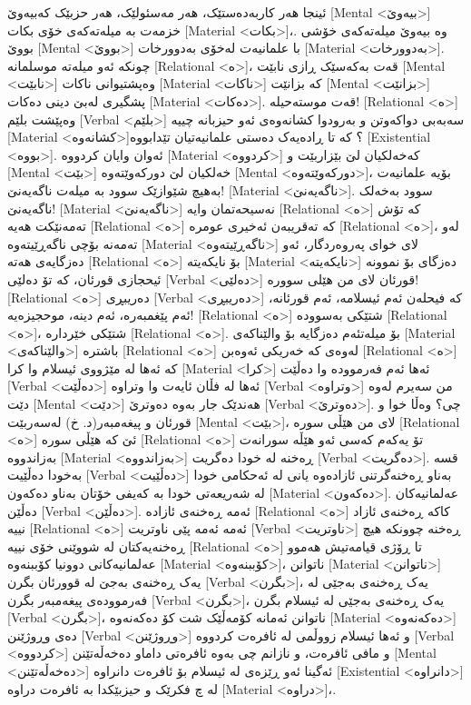 ئینجا هەر کاربەدەستێک، هەر مەسئولێک، هەر حزبێک کەبیەوێ [Mental <بیەوێ>] خزمەت بە میلەتەکەی خۆی بکات [Material <بکات>]،.
وە بیەوێ میلەتەکەی خۆشی بووێ [Mental <بووێ>] با علمانیەت لەخۆی بەدوورخات [Material <بەدوورخات>]. چونکە ئەو میلەتە موسلمانە [Relational <ە>]، قەت بەکەسێک ڕازی نابێت [Mental <نابێت>] وەپشتیوانی ناکات [Material <ناکات>] کە بزانێت [Mental <بزانێت>] پشگیری لەبێ دینی دەکات [Material <دەکات>]. قەت موستەحیلە! [Relational <ە>] وەپێشت بلێم [Verbal <بلێم>] سەبەبی دواکەوتن و بەرودوا کشانەوەی ئەو حیزبانە چییە [Material <کشانەوە>]؟ کە تا ڕادەیەک دەستی علمانیەتیان تێدابووە [Existential <بووە>]. ئەوان وایان کردووە [Material <کردووە>] کەخەلکیان لێ بێزاربێت و [Mental <بێت>] خەلکیان لێ دورکەوێتەوە [Mental <دورکەوێتەوە>]، بۆیە علمانیەت بەهیچ شێوازێک سوود بە میلەت ناگەیەنێ! [Material <ناگەیەنێ>].
سوود بەخەلک ناگەیەنێ! [Material <ناگەیەنێ>] نەسیحەتمان وایە [Relational <ە>] کە تۆش تەمەنێکت هەیە [Relational <ە>] کە تەقریبەن ئەخیری عومرە [Relational <ە>]، لەو تەمەنە بۆچی ناگەڕێیتەوە [Material <ناگەڕێیتەوە>] لای خوای پەروەردگار، ئەو دەزگایەی هەتە [Relational <ە>] بۆ نایکەیتە [Material <نایکەیتە>] دەزگای بۆ نموونە ئیحجازی قورئان، کە تۆ دەلێی [Verbal <دەلێی>] قورئان لای من هێلی سوورە! [Relational <ە>] دەریبڕی [Verbal <دەریبڕی>] کە فیحلەن ئەم ئیسلامە، ئەم قورئانە، ئەم پێغمبەرە، ئەم دینە، موحجیزەیە! [Relational <ە>] شتێکی بەسوودە [Relational <ە>]، شتێکی خێردارە [Relational <ە>]. بۆ میلەتئەم دەزگایە بۆ والێناکەی [Material <والێناکەی>] باشترە [Relational <ە>] لەوەی کە خەریکی ئەوەبن [Relational <ە>] کە ئەها لە مێژووی ئیسلام وا کرا [Material <کرا>] ئەها ئەم فەرموودە وا دەڵێت [Verbal <دەڵێت>] ئەها لە فڵان ئایەت وا وتراوە [Verbal <وتراوە>] من سەیرم لەوە دێت [Mental <دێت>] هەندێک جار بەوە دەوترێ [Verbal <دەوترێ>].
چی؟ وەڵا خوا و قورئان و پیغەمبەر(د. خ) لەسەربێت [Mental <بێت>]، لای من هێڵی سورە [Relational <ە>] ئێ کە هێڵی سوره [Relational <ە>] تۆ یەکەم کەسی ئەو هێڵە سورانەت بەزاندووە [Material <بەزاندووە>] ڕەخنە لە خودا دەگریت [Verbal <دەگریت>]. قسە بەخودا دەڵێیت [Verbal <دەڵێیت>] بەناو ڕەخنەگرتنی ئازادەوە یانی لە ئەحکامی خودا لە شەریعەتی خودا بە کەیفی خۆتان بەناو دەکەون [Material <دەکەون>]. عەلمانیەکان دەڵێن [Verbal <دەڵێن>].
ئەمە ڕەخنەی ئازادە [Relational <ە>] کاکە ڕەخنەی ئازاد نییە [Relational <ە>] ئەمە ئەمە پێی ناوتریت [Verbal <ناوتریت>] ڕەخنە چوونکە هیچ ڕەخنەیەکتان لە شووێنی خۆی نییە [Relational <ە>] تا ڕۆژی قیامەتیش هەموو عەلمانیەکانی دوونیا کۆببنەوە [Material <کۆببنەوە>]، ناتوانن [Material <ناتوانن>] یەک ڕەخنەی بەجێ لە قوورئان بگرن [Verbal <بگرن>]، یەک ڕەخنەی بەجێی له فەرموودەی پیغەمبەر بگرن [Verbal <بگرن>]، یەک ڕەخنەی بەجێی له ئیسلام بگرن [Verbal <بگرن>]، ناتوانن ئەمانە کۆمەڵێک شت کۆ دەکەنەوە [Material <دەکەنەوە>] دەی وڕوژێنن [Verbal <وڕوژێنن>] و ئەها ئیسلام زووڵمی لە ئافرەت کردووە [Verbal <کردووە>] و مافی ئافرەت، و نازانم چی بەوە ئافرەتی داماو دەخەڵەتێنن [Mental <دەخەڵەتێنن>] ئەگینا ئەو ڕێزەی لە ئیسلام بۆ ئافرەت دانراوە [Existential <دانراوە>] لە چ فکرێک و حیزبێکدا بە ئافرەت دراوە [Material <دراوە>]،.
